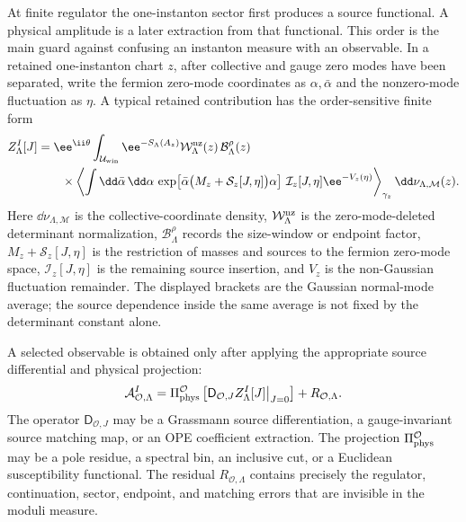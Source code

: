 At finite regulator the one-instanton sector first produces a source
functional.  A physical amplitude is a later extraction from that functional.
This order is the main guard against confusing an instanton measure with an
observable.  In a retained one-instanton chart \(z\), after collective and
gauge zero modes have been separated, write the fermion zero-mode
coordinates as \(\alpha,\bar\alpha\) and the nonzero-mode fluctuation as
\(\eta\).  A typical retained contribution has the order-sensitive finite
form
\begin{equation}
\begin{aligned}
  Z_{\Lambda}^{I}[J]
  &=
  \ee^{\ii\theta}
  \int_{\mathcal U_{\rm win}}
  \ee^{-S_{\Lambda}(A_z)}
  \mathcal W_{\Lambda}^{\rm nz}(z)\,
  \mathcal B_{\Lambda}^{\rho}(z)                         \\
  &\qquad{}\times
  \left\langle
    \int
    \dd\bar\alpha\,\dd\alpha\,
    \exp\!\left[
      \bar\alpha
      \bigl(M_z+\mathcal S_z[J,\eta]\bigr)
      \alpha
    \right]\,
    \mathcal I_z[J,\eta]
    \ee^{-V_z(\eta)}
  \right\rangle_{\gamma_z}
  \dd\nu_{\Lambda,\mathcal M}(z).
\end{aligned}
  \label{eq:instanton-source-functional-route}
\end{equation}
Here \(\dd\nu_{\Lambda,\mathcal M}\) is the collective-coordinate density,
\(\mathcal W_{\Lambda}^{\rm nz}\) is the zero-mode-deleted determinant
normalization, \(\mathcal B_{\Lambda}^{\rho}\) records the size-window or
endpoint factor, \(M_z+\mathcal S_z[J,\eta]\) is the restriction of masses and
sources to the fermion zero-mode space, \(\mathcal I_z[J,\eta]\) is the
remaining source insertion, and \(V_z\) is the non-Gaussian fluctuation
remainder.  The displayed brackets are the Gaussian normal-mode average; the
source dependence inside the same average is not fixed by the determinant
constant alone.

A selected observable is obtained only after applying the appropriate source
differential and physical projection:
\begin{equation}
  \mathcal A_{\mathcal O,\Lambda}^{I}
  =
  \Pi_{\rm phys}^{\mathcal O}
  \left[
    \mathsf D_{\mathcal O,J}
    Z_{\Lambda}^{I}[J]\big|_{J=0}
  \right]
  +R_{\mathcal O,\Lambda}.
  \label{eq:instanton-source-functional-observable-extraction}
\end{equation}
The operator \(\mathsf D_{\mathcal O,J}\) may be a Grassmann source
differentiation, a gauge-invariant source matching map, or an OPE
coefficient extraction.  The projection
\(\Pi_{\rm phys}^{\mathcal O}\) may be a pole residue, a spectral bin, an
inclusive cut, or a Euclidean susceptibility functional.  The residual
\(R_{\mathcal O,\Lambda}\) contains precisely the regulator, continuation,
sector, endpoint, and matching errors that are invisible in the moduli
measure.

